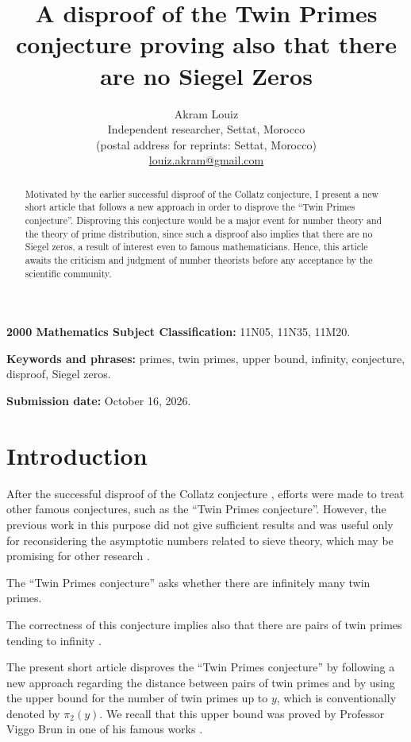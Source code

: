 \documentclass[11pt]{article}
\title{\textbf{A disproof of the Twin Primes conjecture proving also that there are no Siegel Zeros}}
\author{Akram Louiz \\[2pt]
\small Independent researcher, Settat, Morocco \\
\small (postal address for reprints: Settat, Morocco) \\
\small \href{mailto:louiz.akram@gmail.com}{louiz.akram@gmail.com}}
\date{}
\newcommand{\submissiondate}{October 16, 2026}
\begin{document}
\maketitle

\begin{abstract}
\noindent Motivated by the earlier successful disproof of the Collatz conjecture, I present a new short article that follows a new approach in order to disprove the ``Twin Primes conjecture''. Disproving this conjecture would be a major event for number theory and the theory of prime distribution, since such a disproof also implies that there are no Siegel zeros, a result of interest even to famous mathematicians. Hence, this article awaits the criticism and judgment of number theorists before any acceptance by the scientific community.
\end{abstract}

\medskip
\noindent\textbf{2000 Mathematics Subject Classification:} 11N05, 11N35, 11M20.

\smallskip
\noindent\textbf{Keywords and phrases:} primes, twin primes, upper bound, infinity, conjecture, disproof, Siegel zeros.

\smallskip
\noindent\textbf{Submission date:} \submissiondate.

\section{Introduction}

After the successful disproof of the Collatz conjecture \cite{ref1}, efforts were made to treat other famous conjectures, such as the ``Twin Primes conjecture''. However, the previous work in this purpose \cite{ref2} did not give sufficient results and was useful only for reconsidering the asymptotic numbers related to sieve theory, which may be promising for other research \cite{ref3}.

The ``Twin Primes conjecture'' asks whether there are infinitely many twin primes.

The correctness of this conjecture implies also that there are pairs of twin primes tending to infinity \cite{ref4,ref5}.

The present short article disproves the ``Twin Primes conjecture'' by following a new approach regarding the distance between pairs of twin primes and by using the upper bound for the number of twin primes up to $y$, which is conventionally denoted by $\pi_2(y)$. We recall that this upper bound was proved by Professor Viggo Brun in one of his famous works \cite{ref4,ref5}.
\end{document}
